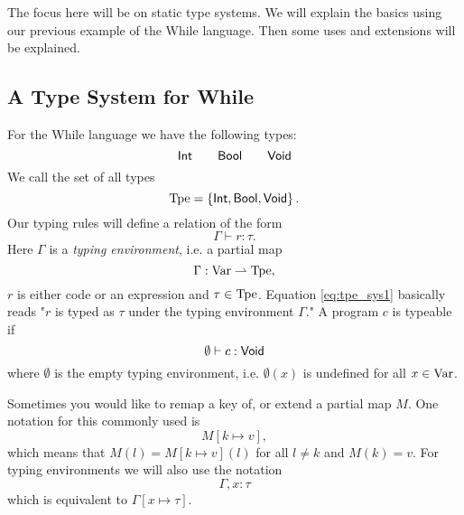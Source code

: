 The focus here will be on static type systems. We will explain the basics using
our previous example of the While language. Then some uses and extensions will be
explained.

\subsection{A Type System for While}
\label{sub:a_type_system_for_while}

For the While language we have the following types:
\begin{equation*}
  \mbox{$\mathsf{Int}$} \quad\quad \mbox{$\mathsf{Bool}$} \quad\quad \mbox{$\mathsf{Void}$}
\end{equation*}
We call the set of all types 
\begin{equation*}
  \mbox{$\mathrm{Tpe}$} = \left\{ \mbox{$\mathsf{Int}$}, \mbox{$\mathsf{Bool}$}, \mbox{$\mathsf{Void}$} \right\}.
\end{equation*}
Our typing rules will define a relation of the form
\begin{equation} \label{eq:tpe_sys1}
  \Gamma \vdash r : \tau.
\end{equation}
Here $\Gamma$ is a \emph{typing environment}, i.e. a partial map
\begin{equation*}
  \Gamma: \mbox{$\mathrm{Var}$} \rightharpoonup \mbox{$\mathrm{Tpe}$},
\end{equation*}
$r$ is either code or an expression and $\tau \in \mbox{$\mathrm{Tpe}$}$.
Equation \eqref{eq:tpe_sys1} basically reads "$r$ is typed as $\tau$ under the
typing environment $\Gamma$." A program $c$ is typeable if
\begin{equation*}
  \emptyset \vdash c : \mbox{$\mathsf{Void}$}
\end{equation*}
where $\emptyset$ is the empty typing environment, i.e. $\emptyset(x)$ is
undefined for all $x \in \mbox{$\mathrm{Var}$}$.

\begin{notation}
  Sometimes you would like to remap a key of, or extend a partial map $M$. One notation
  for this commonly used is 
  \begin{equation*}
    M[k \mapsto v],
  \end{equation*}
  which means that $M(l) = M[k \mapsto v](l)$ for all $l \neq k$ and
  $M(k) = v$.
  For typing environments we will also use the notation
  \begin{equation*}
    \Gamma, x: \tau
  \end{equation*}
  which is equivalent to $\Gamma[x \mapsto \tau]$.
\end{notation}

